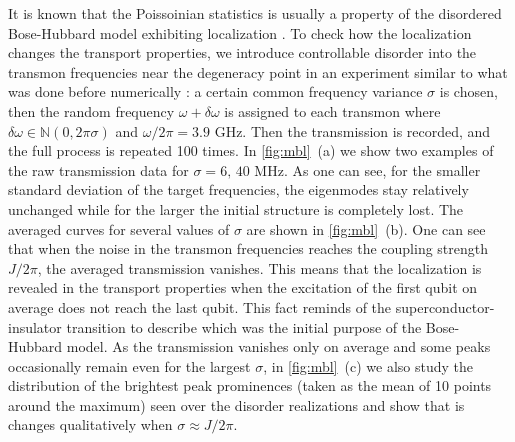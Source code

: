 \documentclass[%
 aps, prl,
 amsmath,amssymb,
 reprint,%
superscriptaddress
]{revtex4-2}
\begin{document}
It is known that the Poissoinian statistics is usually a property of the disordered Bose-Hubbard model exhibiting localization \cite{roushan2017spectroscopic, Yan2019,Ye2019}. To check how the localization changes the transport properties, we introduce controllable disorder into the transmon frequencies near the degeneracy point in an experiment similar to what was done before numerically \cite{orell2019probing}: a certain common frequency variance $\sigma$ is chosen, then the random frequency $\omega + \delta \omega$ is assigned to each transmon where $\delta\omega \in \mathbb N(0,2\pi\sigma)$ and $\omega/2\pi = 3.9$ GHz. Then the transmission is recorded, and the full process is repeated 100 times. 
In \autoref{fig:mbl}~(a) we show two examples of the raw transmission data for  $\sigma = 6,\, 40$ MHz. As one can see, for the smaller standard deviation of the target frequencies, the eigenmodes stay relatively unchanged while for the larger the initial structure is completely lost. The averaged curves for several values of $\sigma$ are shown in \autoref{fig:mbl}~(b). One can see that when the noise in the transmon frequencies reaches the coupling strength $J/2\pi$, the averaged transmission vanishes. This means that the localization is revealed in the transport properties when the excitation of the first qubit on average does not reach the last qubit. This fact reminds of the superconductor-insulator transition \cite{bruder1993superconductor} to describe which was the initial purpose of the Bose-Hubbard model. As the transmission vanishes only on average and some peaks occasionally remain even for the largest $\sigma$, in \autoref{fig:mbl}~(c) we also study the distribution of the brightest peak prominences (taken as the mean of 10 points around the maximum) seen over the disorder realizations and show that is changes qualitatively when $\sigma \approx J/2\pi$.  

\end{document}
